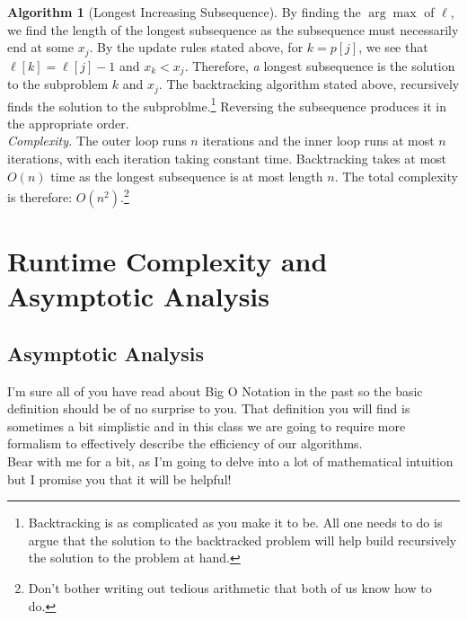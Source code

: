 \documentclass[10pt]{article}
\theoremstyle{plain}
\theoremstyle{definition}
\newtheorem{alg}[thm]{Algorithm}
\numberwithin{equation}{section}
\numberwithin{figure}{section}
\begin{document}
\begin{alg}[Longest Increasing Subsequence]
\noindent By finding the $\arg \max$ of $\ell$, we find the length of the longest subsequence as the subsequence must necessarily end at some $x_j$. By the update rules stated above, for $k = p[j]$, we see that $\ell[k] = \ell[j] - 1$ and $x_k < x_j$. Therefore, \emph{a} longest subsequence is the solution to the subproblem $k$ and $x_j$. The backtracking algorithm stated above, recursively finds the solution to the subproblme.\footnote{Backtracking is as complicated as you make it to be. All one needs to do is argue that the solution to the backtracked problem will help build recursively the solution to the problem at hand.} Reversing the subsequence produces it in the appropriate order. \\

\noindent \textit{Complexity.} The outer loop runs $n$ iterations and the inner loop runs at most $n$ iterations, with each iteration taking constant time. Backtracking takes at most $O(n)$ time as the longest subsequence is at most length $n$. The total complexity is therefore: $O(n^2)$.\footnote{Don't bother writing out tedious arithmetic that both of us know how to do.}

\end{alg}






\newpage
\section{Runtime Complexity and Asymptotic Analysis}
\subsection{Asymptotic Analysis}
I'm sure all of you have read about Big O Notation in the past so the basic definition should be of no surprise to you. That definition you will find is sometimes a bit simplistic and in this class we are going to require more formalism to effectively describe the efficiency of our algorithms. \\

\noindent Bear with me for a bit, as I'm going to delve into a lot of mathematical intuition but I promise you that it will be helpful! \\
\end{document}
